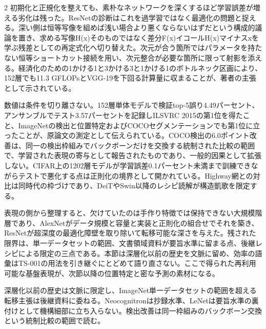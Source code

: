 \documentclass[lualatex,a4paper,10pt]{jlreq}
\begin{document}
\begin{multicols}{2}
\noindent 初期化と正規化を整えても、素朴なネットワークを深くするほど学習誤差が増える劣化は残った。ResNetの診断はこれを過学習ではなく最適化の問題と捉える。深い側は恒等写像を組めば浅い場合より悪くならないはずだという構成的議論を置き、求める写像H(x)そのものではなく差分F(x)イコールH(x)マイナスxを学ぶ残差としての再定式化へ切り替えた。次元が合う箇所ではパラメータを持たない恒等ショートカット接続を用い、次元整合が必要な箇所に限って射影を添える。経済化のための1かける1と3かける3と1かける1のボトルネック区画により、152層でも11.3 GFLOPsとVGG-19を下回る計算量に収まることが、著者の主張として示されている。\autocite{vmd004}\par\medskip
\noindent 数値は条件を切り離さない。152層単体モデルで検証top-5誤り4.49パーセント、アンサンブルでテスト3.57パーセントを記録しILSVRC 2015の第1位を得たこと、ImageNetの検出と位置特定およびCOCOセグメンテーションでも第1位に立ったことが、原論文の測定として伝えられている。COCO検出の6.0ポイント改善は、同一の検出枠組みでバックボーンだけを交換する統制された比較の範囲で、学習された表現の寄与として報告されたものであり、一般的因果として拡張しない。CIFAR上の1202層モデルが学習誤差0.1パーセント未満まで訓練できながらテストで悪化する点は正則化の境界として開かれている。Highway網との対比は同時代の枠づけであり、DeiTやSwin以降のレシピ読解が構造凱歌を限定する。\autocite{vmd004}\par\medskip
\noindent 表現の側から整理すると、欠けていたのは手作り特徴では保持できない大規模階層であり、AlexNetがデータ規模と容量と実装と正則化の組合せでそれを築き、ResNetが超深度の最適化障壁を取り除いて転移可能な深さを与えた。残された限界は、単一データセットの範囲、文書領域資料が要旨水準に留まる点、後継レシピによる限定の三点である。本節は深層化以前の歴史を文脈に留め、効率の語彙はTS-001の用法を引き継ぐにとどめて語り直さない。ここで得られた再利用可能な基盤表現が、次節以降の位置特定と密な予測の素材になる。\autocite{vmd003,vmd004}\par\medskip
\end{multicols}
\begin{claimboundary}[本節の読解上の境界]
\noindent 深層化以前の歴史は文脈に限定し、ImageNet単一データセットの範囲を超える転移主張は後継資料に委ねる。Neocognitronは抄録水準、LeNetは要旨水準の裏付けとして機構細部に立ち入らない。検出改善は同一枠組みのバックボーン交換という統制比較の範囲で読む。\autocite{vmd003,vmd004,vmd001,vmd002}\par
\end{claimboundary}

\Needspace{0.20\textheight}
\end{document}
